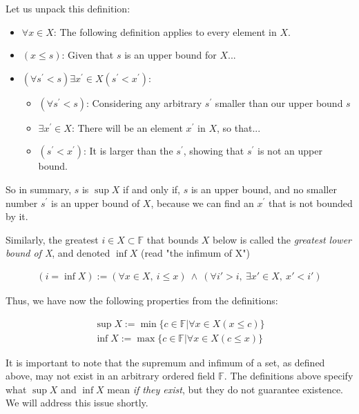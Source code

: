 Let us unpack this definition:

\begin{itemize}
\item $\forall x \in X$: The following definition applies to every element in $X$.
\item $(x \leq s)$: Given that $s$ is an upper bound for $X$...
\item $(\forall s^{\prime} < s) \exists x^{\prime} \in X (s^{\prime} < x^{\prime})$:

\begin{itemize}
\item $(\forall s^{\prime} < s)$: Considering any arbitrary $s^{\prime}$ smaller than our upper bound $s$
\item $\exists x^{\prime} \in X$: There will be an element $x^\prime$ in $X$, so that...
\item $(s^{\prime} < x^{\prime})$: It is larger than the $s^{\prime}$, showing that $s^{\prime}$ is not an upper bound.
\end{itemize}
\end{itemize}

So in summary, $s$ is $\sup{X}$ if and only if, $s$ is an upper bound, and no smaller number $s^{\prime}$ is an upper bound of $X$, because we can find an $x^\prime$ that is not bounded by it.

\begin{definition}
Similarly, the greatest $i \in X \subset \mathbb{F}$ that bounds $X$ below is called the \textit{greatest lower bound of X}, and denoted $\inf X$ (read "the infimum of X")

\begin{align*}
(i = \inf X) := \left(\forall x \in X, \ i \leq x\right) \ \wedge \ \left(\forall i' > i, \ \exists x' \in X, \ x' < i'\right)
\end{align*}

\end{definition}

Thus, we have now the following properties from the definitions:

\begin{align*}
\sup X := \min \{c \in \mathbb{F} | \forall x \in X (x \leq c)\} \\
\inf X := \max \{c \in \mathbb{F} | \forall x \in X (c \leq x)\}
\end{align*}

It is important to note that the supremum and infimum of a set, as defined above, may not exist in an arbitrary ordered field $\mathbb{F}$. The definitions above specify what $\sup X$ and $\inf X$ mean \textit{if they exist}, but they do not guarantee existence. We will address this issue shortly.

